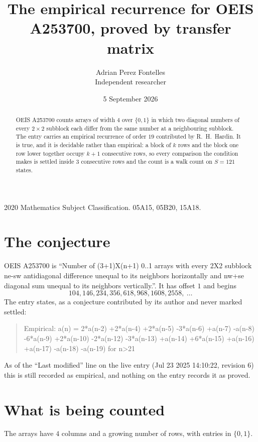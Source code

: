 \documentclass[11pt,a4paper]{article}
\title{The empirical recurrence for OEIS A253700, proved by transfer matrix}
\author{Adrian Perez Fontelles\\ \small Independent researcher}
\date{5 September 2026}
\theoremstyle{plain}
\theoremstyle{definition}
\begin{document}
\maketitle

\begin{abstract}
OEIS A253700 counts arrays of width $4$ over $\{0,1\}$ in which two diagonal numbers of every $2\times2$ subblock each differ from the same number at a neighbouring subblock. The entry carries an
empirical recurrence of order $19$ contributed by R.~H.~Hardin. It is true, and it is
decidable rather than empirical: a block of $k$ rows and the block one row lower together
occupy $k+1$ consecutive rows, so every comparison the condition makes is settled inside
$3$ consecutive rows and the count is a walk count on $S=121$ states.
\end{abstract}

\noindent\small 2020 Mathematics Subject Classification. 05A15, 05B20, 15A18.\normalsize

\section{The conjecture}

OEIS A253700 is ``Number of (3+1)X(n+1) 0..1 arrays with every 2X2 subblock ne-sw antidiagonal difference unequal to its neighbors horizontally and nw+se diagonal sum unequal to its neighbors vertically.''. It has offset $1$ and begins
\[
104, 146, 234, 356, 618, 968, 1608, 2558,\ \dots
\]
The entry states, as a conjecture contributed by its author and never marked settled:
\begin{quote}
Empirical: a(n) = 2*a(n-2) +2*a(n-4) +2*a(n-5) -3*a(n-6) +a(n-7) -a(n-8) -6*a(n-9) +2*a(n-10) -2*a(n-12) -3*a(n-13) +a(n-14) +6*a(n-15) +a(n-16) +a(n-17) -a(n-18) -a(n-19) for n>21
\end{quote}
As of the ``Last modified'' line on the live entry (Jul 23 2025 14:10:22, revision 6) this is still
recorded as empirical, and nothing on the entry records it as proved.

\section{What is being counted}

The arrays have $4$ columns and a growing number of rows, with entries in $\{0,1\}$.
\end{document}
